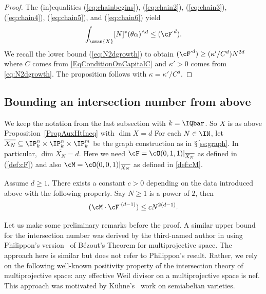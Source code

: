 \begin{proof}
The (in)equalities  (\ref{eq:chainbegins}),
(\ref{eq:chain2}), (\ref{eq:chain3}),
(\ref{eq:chain4}), (\ref{eq:chain5}), and (\ref{eq:chain6}) yield
\begin{equation*}
  \int_{\sman{X}} [N]^*(\theta\alpha)^{\wedge d} \le (\cF^{\cdot d}).
\end{equation*}
We recall the  lower bound (\ref{eq:N2dgrowth}) %
to  obtain
$(\cF^{\cdot d}) \ge (\kappa'/C^d) N^{2d}$ where $C$ comes from
\eqref{EqConditionOnCapitalC} and $\kappa' > 0$ comes from
\eqref{eq:N2dgrowth}.
The proposition follows with $\kappa = \kappa'/C^d$.
\end{proof}


\subsection{Bounding an intersection number from above}

We keep the notation from the last subsection with $k=\IQbar$.
So  $X$ is as above Proposition~\ref{PropAuxHtIneq} with $\dim X=d$
For each $N \in \IN$, let $\overline{X_N} \subseteq \IP_k^n \times
\IP_k^n \times \IP_k^m$ be the graph construction as in $\mathsection$\ref{ss:graph}. In
particular, $\dim \overline{X_N} = d$.  Here we need $\cF =
\cO(0,1,1)|_{\overline{X_N}}$ as defined in (\ref{def:cF}) and also
 $\cM = \cO(0,0,1)|_{\overline{X_N}}$ as defined in \eqref{def:cM}.

\begin{proposition}
\notready
  \label{prop:intersectionub}
Assume $d \ge 1$.  There exists a constant $c>0$ depending on the data introduced above
  with the following property. Say $N\ge 1$ is a power of $2$, then
  \begin{equation*}
    (\cM\cdot \cF^{\cdot(d-1)}) \le c N^{2(d-1)}.
  \end{equation*}
\end{proposition}

Let us make some preliminary remarks before the proof. A similar upper
bound for the intersection number was derived by the third-named
author in \cite{habegger:imrn,Hab:Special} using Philippon's
version~\cite{Philippon} of B\'ezout's Theorem for multiprojective
space. The approach here is similar but does not
 refer to Philippon's result. Rather, we rely on the following well-known
positivity property of the intersection theory of multiprojective
space: any effective Weil divisor on a multiprojective space is
nef. This approach was motivated by
K\"uhne's~\cite{kuehne:semiabelianbhc} work on semiabelian varieties.

